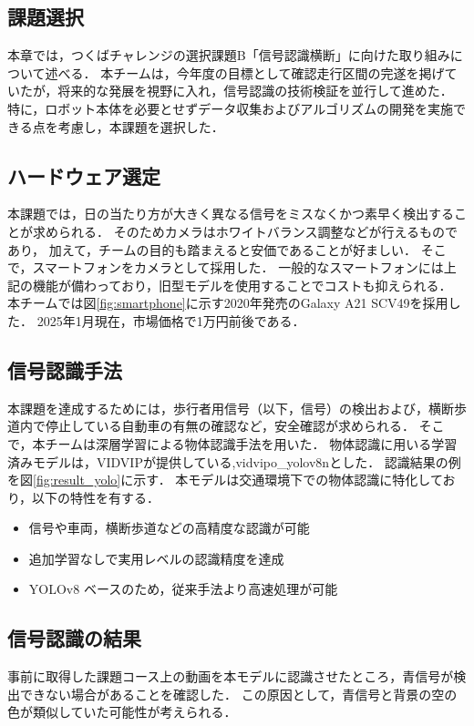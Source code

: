 \documentclass[twocolumn,9pt]{jsproceedings}
\begin{document}
\subsection{課題選択}
本章では，つくばチャレンジの選択課題B「信号認識横断」に向けた取り組みについて述べる．
本チームは，今年度の目標として確認走行区間の完遂を掲げていたが，将来的な発展を視野に入れ，信号認識の技術検証を並行して進めた．
特に，ロボット本体を必要とせずデータ収集およびアルゴリズムの開発を実施できる点を考慮し，本課題を選択した．

\subsection{ハードウェア選定}
本課題では，日の当たり方が大きく異なる信号をミスなくかつ素早く検出することが求められる．
そのためカメラはホワイトバランス調整などが行えるものであり，
加えて，チームの目的も踏まえると安価であることが好ましい．
そこで，スマートフォンをカメラとして採用した．
一般的なスマートフォンには上記の機能が備わっており，旧型モデルを使用することでコストも抑えられる．
本チームでは図\ref{fig:smartphone}に示す2020年発売のGalaxy A21 SCV49を採用した．
2025年1月現在，市場価格で1万円前後である．

\subsection{信号認識手法}
本課題を達成するためには，歩行者用信号（以下，信号）の検出および，横断歩道内で停止している自動車の有無の確認など，安全確認が求められる．
そこで，本チームは深層学習による物体認識手法を用いた．
物体認識に用いる学習済みモデルは，VIDVIP\cite{BabaVIDVIP}が提供している,vidvipo\_yolov8nとした．
認識結果の例を図\ref{fig:result_yolo}に示す．
本モデルは交通環境下での物体認識に特化しており，以下の特性を有する．

\begin{itemize}
    \item 信号や車両，横断歩道などの高精度な認識が可能
    \item 追加学習なしで実用レベルの認識精度を達成
    \item YOLOv8 ベースのため，従来手法より高速処理が可能
\end{itemize}

\subsection{信号認識の結果}
事前に取得した課題コース上の動画を本モデルに認識させたところ，青信号が検出できない場合があることを確認した．
この原因として，青信号と背景の空の色が類似していた可能性が考えられる．
\end{document}
